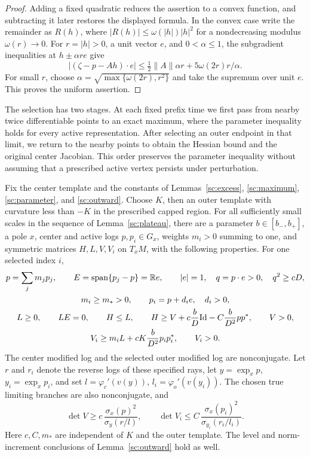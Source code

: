 \begin{proof}
Adding a fixed quadratic reduces the assertion to a
convex function, and subtracting it later restores the displayed
formula. In the convex case write the remainder as $R(h)$, where
$|R(h)|\le\omega(|h|)|h|^2$ for a nondecreasing modulus
$\omega(r)\to0$. For $r=|h|>0$, a unit vector $e$, and
$0<\alpha\le1$, the subgradient inequalities at
$h\pm\alpha r e$ give
\[
 |(\zeta-p-Ah)\cdot e|
 \le \tfrac12\|A\|\alpha r
        +5\omega(2r)r/\alpha.
\]
For small $r$, choose
$\alpha=\sqrt{\max\{\omega(2r),r^2\}}$ and take the supremum
over unit $e$. This proves the uniform assertion.
\end{proof}

The selection has two stages. At each fixed prefix time we first pass
from nearby twice differentiable points to an exact maximum, where the
parameter inequality holds for every active representation. After
selecting an outer endpoint in that limit, we return to the nearby
points to obtain the Hessian bound and the original center Jacobian.
This order preserves the parameter inequality without assuming that a
prescribed active vertex persists under perturbation.

\begin{proposition}
\label{jet:determinants}
Fix the center template and the constants of
Lemmas~\ref{sc:excess}, \ref{sc:maximum}, \ref{sc:parameter}, and
\ref{sc:outward}. Choose $K$, then an outer template with curvature
less than $-K$ in the prescribed capped region. For all sufficiently
small scales in the sequence of Lemma~\ref{sc:plateau}, there are
a parameter $b\in[b_-,b_+]$, a pole $x$, center and active logs
$p,p_i\in G_x$, weights $m_i>0$ summing to one, and symmetric
matrices $H,L,V,V_i$ on $T_xM$, with the following properties.
For one selected index $i$,
\begin{gather}
 p=\sum_jm_jp_j,\qquad
 E=\operatorname{span}\{p_j-p\}=\mathbb R e,\qquad |e|=1,\quad
 q=p\cdot e>0,\quad q^2\ge cD, \label{jet:limiting-geometry}\\
 m_i\ge m_*>0,\qquad p_i=p+d_ie,\quad d_i>0, \label{jet:limiting-outward}\\
 L\ge0,\qquad LE=0,\qquad H\le L,\qquad
 H\ge V+c\frac bD\mathrm{Id}-C\frac b{D^2}pp^*,\qquad V>0,
 \label{jet:limiting-center}\\
 V_i\ge m_iL+cK\frac b{D^2}p_ip_i^*,\qquad V_i>0.
 \label{jet:limiting-outer}
\end{gather}
The center modified log and the selected outer modified log are
nonconjugate. Let $r$ and $r_i$ denote the reverse logs of these
specified rays, let $y=\exp_xp$, $y_i=\exp_xp_i$, and set
$l=\varphi_c'(v(y))$, $l_i=\varphi_o'(v(y_i))$. The chosen true
limiting branches are also nonconjugate, and
\begin{equation}\label{jet:limiting-determinants}
 \det V\ge c\,\frac{\sigma_x(p)^2}{\sigma_y(r/l)},
 \qquad
 \det V_i\le C\,\frac{\sigma_x(p_i)^2}{\sigma_{y_i}(r_i/l_i)}.
\end{equation}
Here $c,C,m_*$ are independent of $K$ and the outer template.
The level and norm-increment conclusions of
Lemma~\ref{sc:outward} hold as well.
\end{proposition}

